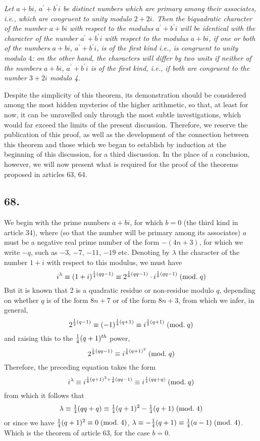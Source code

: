 \documentclass[twoside,12pt]{memoir}
\renewcommand{\pmod}[1]{\;(\textrm{mod.}\;#1)}
\let\oldfrac\frac
\def\frac#1#2{\mathchoice{\tfrac{#1}{#2}}{\oldfrac{#1}{#2}}{\genfrac{}{}{}{2}{#1}{#2\mathstrut}}{\genfrac{}{}{}{3}{#1}{#2\mathstrut}}}
\begin{document}
\textit{Let \(a+bi\), \(a^{\prime}+b^{\prime}i\) be distinct numbers which are primary among their associates, i{.}e{.}, which are congruent to unity modulo \(2+2i\).  Then the biquadratic character of the number \(a+bi\) with respect to the modulus \(a^{\prime}+b^{\prime}i\) will be identical with the character of the number \(a^{\prime}+b^{\prime}i\) with respect to the modulus \(a+bi\), if one or both of the numbers \(a+bi\), \(a^{\prime}+b^{\prime}i\), is of the first kind i{.}e{.}, is congruent to unity modulo \(4\): on the other hand, the characters will differ by two units if neither of the numbers \(a+bi\), \(a^{\prime}+b^{\prime}i\) is of the first kind, i{.}e{.}, if both are congruent to the number \(3+2i\) modulo 4.}\pagebreak%

Despite the simplicity of this theorem, its demonstration should be considered among the most hidden mysteries of the higher arithmetic, so that, at least for now, it can be unravelled only through the most subtle investigations, which would far exceed the limits of the present discussion. Therefore, we reserve the publication of this proof, as well as the development of the connection between this theorem and those which we began to establish by induction at the beginning of this discussion, for a third discussion. In the place of a conclusion, however, we will now present what is required for the proof of the theorems proposed in articles 63, 64.

\subsection*{68.}

We begin with the prime numbers \(a+b i\), for which \(b=0\) (the third kind in article 34), where (so that the number will be primary among its associates) \(a\) must be a negative real prime number of the form \(-(4n+3)\), for which we write \(-q\), such as \(-3\), \(-7\), \(-11\), \(-19\) etc{.} Denoting by \(\lambda\) the character of the number \(1+i\) with respect to this modulus, we must have
\[i^{\lambda} \equiv (1+i)^{\frac{1}{4}(qq-1)} \equiv 2^{\frac{1}{8}(qq-1)} \cdot i^{\frac{1}{8}(qq-1)}\pmod{q}\]
But it is known that 2 is a quadratic residue or non-residue modulo \(q\), depending on whether \(q\) is of the form \(8n+7\) or of the form \(8n+3\), from which we infer, in general,
\[2^{\frac{1}{2}(q-1)} \equiv (-1)^{\frac{1}{4}(q+1)} \equiv i^{\frac{1}{2}(q+1)}\pmod{q}\]
and raising this to the \(\frac{1}{4}(q+1)^{th}\) power,
\[2^{\frac{1}{8}(qq-1)} \equiv i^{\frac{1}{8}(q+1)^{2}}\pmod{q}\]
Therefore, the preceding equation takes the form
\[i^{\lambda} \equiv i^{\frac{1}{8}(q+1)^{2}+\frac{1}{8}(qq-1)} \equiv i^{\frac{1}{4}(qq+q)}\pmod{q}\]
from which it follows that
\[\lambda \equiv \frac{1}{4}(qq+q) \equiv \frac{1}{4}(q+1)^{2}-\frac{1}{4}(q+1)\pmod{4}\]
or since we have \(\frac{1}{4}(q+1)^{2} \equiv 0\pmod{4}\), \(\lambda \equiv -\frac{1}{4}(q+1) \equiv \frac{1}{4}(a-1)\pmod{4}\).
Which is the theorem of article 63, for the case \(b=0\).\pagebreak%
\end{document}

